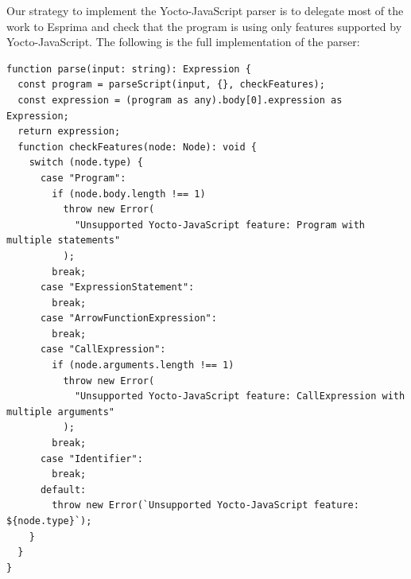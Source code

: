 \documentclass[12pt, oneside]{book}
\begin{document}
Our strategy to implement the Yocto-JavaScript parser is to delegate most of the work to Esprima and check that the program is using only features supported by Yocto-JavaScript. The following is the full implementation of the parser:

\begin{verbatim}
function parse(input: string): Expression {
  const program = parseScript(input, {}, checkFeatures);
  const expression = (program as any).body[0].expression as Expression;
  return expression;
  function checkFeatures(node: Node): void {
    switch (node.type) {
      case "Program":
        if (node.body.length !== 1)
          throw new Error(
            "Unsupported Yocto-JavaScript feature: Program with multiple statements"
          );
        break;
      case "ExpressionStatement":
        break;
      case "ArrowFunctionExpression":
        break;
      case "CallExpression":
        if (node.arguments.length !== 1)
          throw new Error(
            "Unsupported Yocto-JavaScript feature: CallExpression with multiple arguments"
          );
        break;
      case "Identifier":
        break;
      default:
        throw new Error(`Unsupported Yocto-JavaScript feature: ${node.type}`);
    }
  }
}
\end{verbatim}
\end{document}
